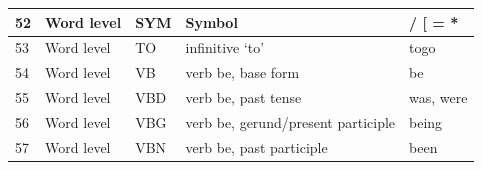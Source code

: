 \begin{longtable}{|p{}|p{}|p{}|p{}|p{}|}
		\rowcolor[HTML]{9AFF99} 
		52                                                        & Word level                                                  & SYM                                                        & Symbol                                                                                                          & / {[} = *                                                                       \\ \hline
		\rowcolor[HTML]{9AFF99} 
		53                                                        & Word level                                                  & TO                                                         & infinitive ‘to’                                                                                                 & togo                                                                            \\ \hline
		\rowcolor[HTML]{FFCCC9} 
		54                                                        & Word level                                                  & VB                                                         & verb be, base form                                                                                              & be                                                                              \\ \hline
		\rowcolor[HTML]{FFCCC9} 
		55                                                        & Word level                                                  & VBD                                                        & verb be, past tense                                                                                             & was, were                                                                       \\ \hline
		\rowcolor[HTML]{FFCCC9} 
		56                                                        & Word level                                                  & VBG                                                        & verb be, gerund/present participle                                                                              & being                                                                           \\ \hline
		\rowcolor[HTML]{FFCCC9} 
		57                                                        & Word level                                                  & VBN                                                        & verb be, past participle                                                                                        & been                                                                            \\ \hline

\end{longtable}

